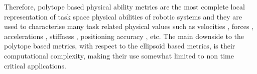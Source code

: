 Therefore, polytope based physical ability metrics are the most complete local representation of task space physical abilities of robotic systems and they are used to characterise many task related physical values such as velocities \cite{Lee1997manip, long_constrained_2020}, forces \cite{chiacchio_evaluation_1996}, accelerations \cite{chiacchio_2000}, stiffness \cite{ajoudani2015role}, positioning accuracy \cite{pholsiri2005real}, etc.
The main downside to the polytope based metrics, with respect to the ellipsoid based metrics, is their computational complexity, making their use somewhat limited to non time critical applications.


